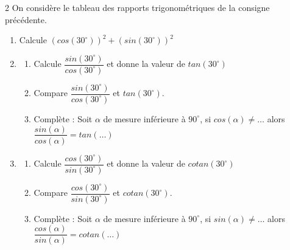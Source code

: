 \begin{multicols}{2}
  	On considère le tableau des rapports trigonométriques de la consigne précédente. \\
  	\begin{enumerate}
  		\item Calcule $ (cos(30^\circ))^2+ (sin(30^\circ))^2 $
  		\item \begin{enumerate} \item Calcule $ \dfrac{sin(30^\circ)}{cos(30^\circ)}  $ et donne la valeur de $ tan(30^\circ ) $ 
  			\item Compare $ \dfrac{sin(30^\circ)}{cos(30^\circ)}   $ et $ tan(30^\circ ) $.
  			\item Complète : \og Soit $ \alpha $ de mesure inférieure à $ 90^\circ $, si $ cos(\alpha)\neq \dots  $ alors $ \dfrac{sin(\alpha)}{cos(\alpha)} =tan(\dotsc ) $ \fg{}
  		\end{enumerate}
  		\item \begin{enumerate} \item Calcule $ \dfrac{cos(30^\circ)}{sin(30^\circ)}  $ et donne la valeur de $ cotan(30^\circ ) $ 
  			\item Compare $ \dfrac{cos(30^\circ)}{sin(30^\circ)}   $ et $ cotan(30^\circ ) $.
  			\item Complète : \og Soit $ \alpha $ de mesure inférieure à $ 90^\circ $, si $ sin(\alpha)\neq \dots  $ alors $ \dfrac{cos(\alpha)}{sin(\alpha)} =cotan(\dotsc ) $ \fg{}
  		\end{enumerate}
  	\end{enumerate}
  	\dures
  	 
\end{multicols}
